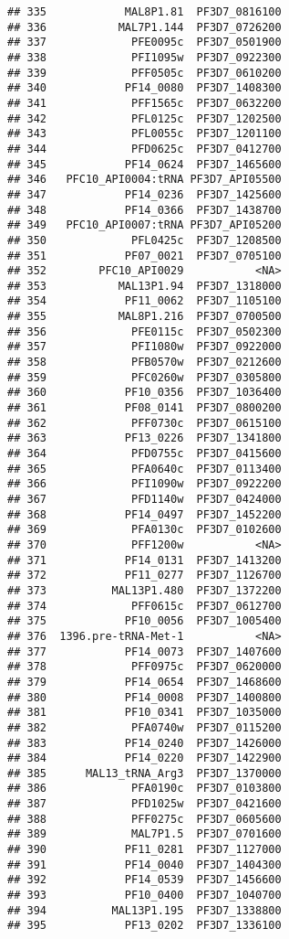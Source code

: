 \documentclass[12pt, a4paper]{article}\usepackage[]{graphicx}\usepackage[]{color}
\makeatletter
\newenvironment{kframe}{%
 \def\at@end@of@kframe{}%
 \ifinner\ifhmode%
  \def\at@end@of@kframe{\end{minipage}}%
  \begin{minipage}{\columnwidth}%
 \fi\fi%
 \def\FrameCommand##1{\hskip\@totalleftmargin \hskip-\fboxsep
 \colorbox{shadecolor}{##1}\hskip-\fboxsep
     \hskip-\linewidth \hskip-\@totalleftmargin \hskip\columnwidth}%
 \MakeFramed {\advance\hsize-\width
   \@totalleftmargin\z@ \linewidth\hsize
   \@setminipage}}%
 {\par\unskip\endMakeFramed%
 \at@end@of@kframe}
\newenvironment{knitrout}{}{} %
\makeatother
\begin{document}
\begin{knitrout}
\begin{kframe}
\begin{verbatim}
## 335            MAL8P1.81  PF3D7_0816100
## 336           MAL7P1.144  PF3D7_0726200
## 337             PFE0095c  PF3D7_0501900
## 338             PFI1095w  PF3D7_0922300
## 339             PFF0505c  PF3D7_0610200
## 340            PF14_0080  PF3D7_1408300
## 341             PFF1565c  PF3D7_0632200
## 342             PFL0125c  PF3D7_1202500
## 343             PFL0055c  PF3D7_1201100
## 344             PFD0625c  PF3D7_0412700
## 345            PF14_0624  PF3D7_1465600
## 346   PFC10_API0004:tRNA PF3D7_API05500
## 347            PF14_0236  PF3D7_1425600
## 348            PF14_0366  PF3D7_1438700
## 349   PFC10_API0007:tRNA PF3D7_API05200
## 350             PFL0425c  PF3D7_1208500
## 351            PF07_0021  PF3D7_0705100
## 352        PFC10_API0029           <NA>
## 353           MAL13P1.94  PF3D7_1318000
## 354            PF11_0062  PF3D7_1105100
## 355           MAL8P1.216  PF3D7_0700500
## 356             PFE0115c  PF3D7_0502300
## 357             PFI1080w  PF3D7_0922000
## 358             PFB0570w  PF3D7_0212600
## 359             PFC0260w  PF3D7_0305800
## 360            PF10_0356  PF3D7_1036400
## 361            PF08_0141  PF3D7_0800200
## 362             PFF0730c  PF3D7_0615100
## 363            PF13_0226  PF3D7_1341800
## 364             PFD0755c  PF3D7_0415600
## 365             PFA0640c  PF3D7_0113400
## 366             PFI1090w  PF3D7_0922200
## 367             PFD1140w  PF3D7_0424000
## 368            PF14_0497  PF3D7_1452200
## 369             PFA0130c  PF3D7_0102600
## 370             PFF1200w           <NA>
## 371            PF14_0131  PF3D7_1413200
## 372            PF11_0277  PF3D7_1126700
## 373          MAL13P1.480  PF3D7_1372200
## 374             PFF0615c  PF3D7_0612700
## 375            PF10_0056  PF3D7_1005400
## 376  1396.pre-tRNA-Met-1           <NA>
## 377            PF14_0073  PF3D7_1407600
## 378             PFF0975c  PF3D7_0620000
## 379            PF14_0654  PF3D7_1468600
## 380            PF14_0008  PF3D7_1400800
## 381            PF10_0341  PF3D7_1035000
## 382             PFA0740w  PF3D7_0115200
## 383            PF14_0240  PF3D7_1426000
## 384            PF14_0220  PF3D7_1422900
## 385      MAL13_tRNA_Arg3  PF3D7_1370000
## 386             PFA0190c  PF3D7_0103800
## 387             PFD1025w  PF3D7_0421600
## 388             PFF0275c  PF3D7_0605600
## 389             MAL7P1.5  PF3D7_0701600
## 390            PF11_0281  PF3D7_1127000
## 391            PF14_0040  PF3D7_1404300
## 392            PF14_0539  PF3D7_1456600
## 393            PF10_0400  PF3D7_1040700
## 394          MAL13P1.195  PF3D7_1338800
## 395            PF13_0202  PF3D7_1336100

\end{verbatim}
\end{kframe}
\end{knitrout}
\end{document}
